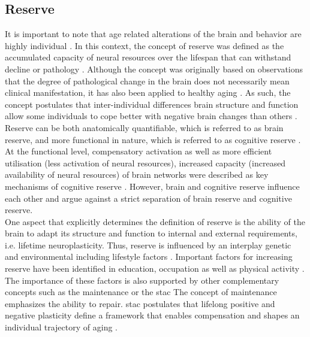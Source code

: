\subsection{Reserve}
\label{theory:aging:reserve}
It is important to note that age related alterations of the brain and behavior are highly individual \cite{Smith2020,Koen2019,Douw2014}. In this context, the concept of reserve was defined as the accumulated capacity of neural resources over the lifespan that can withstand decline or pathology \cite{Cabeza2018, Stern2009}. Although the concept was originally based on observations that the degree of pathological change in the brain does not necessarily mean clinical manifestation, it has also been applied to healthy aging \cite{Esiri2001,Cabeza2018,Stern2009}. As such, the concept postulates that inter-individual differences brain structure and function allow some individuals to cope better with negative brain changes than others \cite{Stern2009}.\\
Reserve can be both anatomically quantifiable, which is referred to as brain reserve, and more functional in nature, which is referred to as cognitive reserve \cite{Stern2009}. At the functional level, compensatory activation as well as more efficient utilisation (less activation of neural resources), increased capacity (increased availability of neural resources) of brain networks were described as key mechanisms of cognitive reserve \cite{Stern2004,Stern2009}. However, brain and cognitive reserve influence each other and \citeauthor{Cabeza2018} \cite{Cabeza2018} argue against a strict separation of brain reserve and cognitive reserve.\\
One aspect that explicitly determines the definition of reserve is the ability of the brain to adapt its structure and function to internal and external requirements, i.e. lifetime neuroplasticity. Thus, reserve is influenced by an interplay genetic and environmental including lifestyle factors \cite{Cabeza2018}. Important factors for increasing reserve have been identified in education, occupation as well as physical activity \cite{Cabeza2018,Stern2009}.
The importance of these factors is also supported by other complementary concepts such as the maintenance or the \gls{stac} The concept of maintenance emphasizes the ability to repair. \Gls{stac} postulates that lifelong positive and negative plasticity define a framework that enables compensation and shapes an individual trajectory of aging \cite{Reuter-Lorenz2014}.

